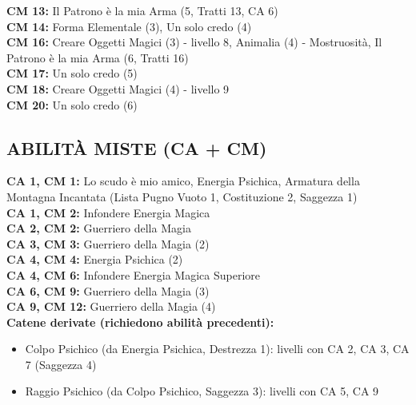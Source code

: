 \begin{multicols}{2}
	\textbf{CM 13:} Il Patrono è la mia Arma (5, Tratti 13, CA 6)\\

	\textbf{CM 14:} Forma Elementale (3), Un solo credo (4)\\

	\textbf{CM 16:} Creare Oggetti Magici (3) - livello 8, Animalia (4) - Mostruosità, Il Patrono è la mia Arma (6, Tratti 16)\\

	\textbf{CM 17:} Un solo credo (5)\\

	\textbf{CM 18:} Creare Oggetti Magici (4) - livello 9\\

	\textbf{CM 20:} Un solo credo (6)\\

	\subsection{ABILITÀ MISTE (CA + CM)}

	\textbf{CA 1, CM 1:} Lo scudo è mio amico, Energia Psichica, Armatura della Montagna Incantata (Lista Pugno Vuoto 1, Costituzione 2, Saggezza 1)\\

	\textbf{CA 1, CM 2:} Infondere Energia Magica\\

	\textbf{CA 2, CM 2:} Guerriero della Magia\\

	\textbf{CA 3, CM 3:} Guerriero della Magia (2)\\

	\textbf{CA 4, CM 4:} Energia Psichica (2)\\

	\textbf{CA 4, CM 6:} Infondere Energia Magica Superiore\\

	\textbf{CA 6, CM 9:} Guerriero della Magia (3)\\

	\textbf{CA 9, CM 12:} Guerriero della Magia (4)\\

	\textbf{Catene derivate (richiedono abilità precedenti):}
	\begin{itemize}
		\item Colpo Psichico (da Energia Psichica, Destrezza 1): livelli con CA 2, CA 3, CA 7 (Saggezza 4)
		\item Raggio Psichico (da Colpo Psichico, Saggezza 3): livelli con CA 5, CA 9
	\end{itemize}


\end{multicols}
